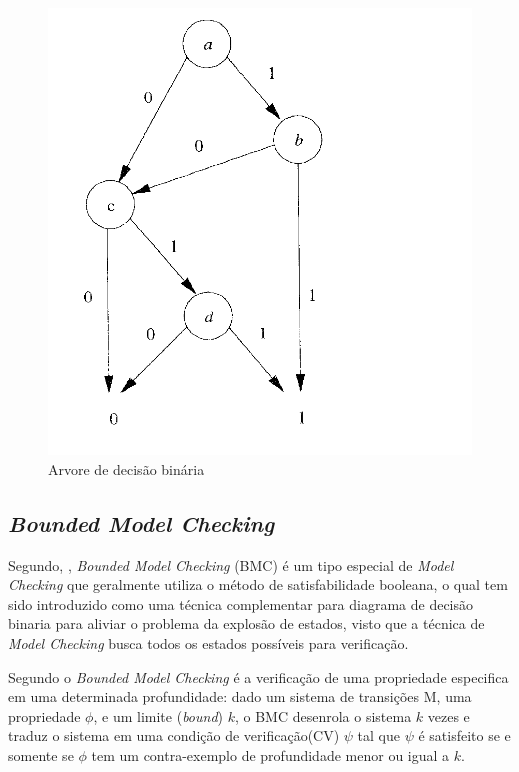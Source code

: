 \begin{figure}[htb]
	\begin{center}
    \caption{\label{fig:bdd_fig}Arvore de decisão binária}
	\includegraphics[scale=0.20]{Figuras/Arvore_BDD.png}
	\end{center}
\end{figure}

\subsection{\textit{Bounded Model Checking}}
Segundo, \citeauthor{rocha2015verificaccao}, \textit{Bounded Model Checking} (BMC) é um tipo especial de \textit{Model Checking} que geralmente utiliza o método de satisfabilidade booleana, o qual tem sido introduzido como uma técnica complementar para diagrama de decisão binaria para aliviar o problema da explosão de estados, visto que a técnica de \textit{Model Checking} busca todos os estados possíveis para verificação.

\par
Segundo \cite{rocha2015verificaccao} o \textit{Bounded Model Checking} é a verificação de uma propriedade especifica em uma determinada profundidade: dado um sistema de transições M, uma propriedade $\phi$, e um limite (\textit{bound}) $k$, o BMC desenrola o sistema $k$ vezes e traduz o sistema em uma condição de verificação(CV) $\psi$ tal que $\psi$ é satisfeito se e somente se $\phi$ tem um contra-exemplo de profundidade menor ou igual a $k$.

